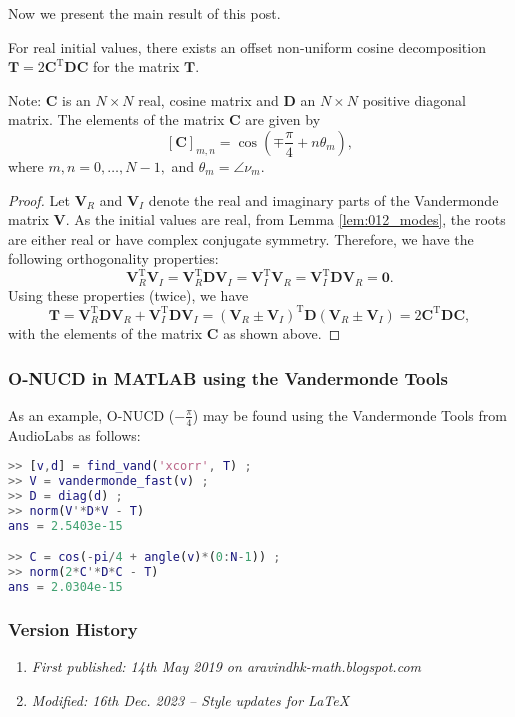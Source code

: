 Now we present the main result of this post.

\begin{theorem}[O-NUCD]
For real initial values, there exists an offset non-uniform cosine decomposition $\boldsymbol{T} = 2 \boldsymbol{C}^\text{T} \boldsymbol{D} \boldsymbol{C}$ for the matrix $\boldsymbol{T}.$
\end{theorem}

Note: $\boldsymbol{C}$ is an $N\times N$ real, cosine matrix and $\boldsymbol{D}$ an $N\times N$ positive diagonal matrix. The elements of the matrix $\boldsymbol{C}$ are given by \[
[\boldsymbol{C}]_{m,n} = \cos\left(\mp \frac{\pi}{4} + n \theta_m\right),\] where $m,n = 0,\dots,N-1,$  and $\theta_m = \angle \nu_m.$

\begin{proof}
Let $\boldsymbol{V}_R$ and $\boldsymbol{V}_I$ denote the real and imaginary parts of the Vandermonde matrix $\boldsymbol{V}.$ As the initial values are real, from Lemma \ref{lem:012_modes}, the roots are either real or have complex conjugate symmetry. Therefore, we have the following orthogonality properties: \[\boldsymbol{V}_R^\text{T} \boldsymbol{V}_I = \boldsymbol{V}_R^\text{T} \boldsymbol{D} \boldsymbol{V}_I = \boldsymbol{V}_I^\text{T} \boldsymbol{V}_R = \boldsymbol{V}_I^\text{T} \boldsymbol{D} \boldsymbol{V}_R =\boldsymbol{0}.\] Using these properties (twice), we have \[\boldsymbol{T} =  \boldsymbol{V}_R^\text{T} \boldsymbol{D} \boldsymbol{V}_R +  \boldsymbol{V}_I^\text{T} \boldsymbol{D} \boldsymbol{V}_I = (\boldsymbol{V}_R \pm \boldsymbol{V}_I)^\text{T} \boldsymbol{D} (\boldsymbol{V}_R \pm \boldsymbol{V}_I) = 2 \boldsymbol{C}^\text{T} \boldsymbol{D} \boldsymbol{C},\] with the elements of the matrix $\boldsymbol{C}$ as shown above.
\end{proof}

\subsubsection{O-NUCD in MATLAB using the Vandermonde Tools}
As an example, O-NUCD ($-\frac{\pi}{4}$) may be found using the Vandermonde Tools from AudioLabs \cite{Backstrom2015} as follows:

\begin{lstlisting}[language=MATLAB,numbers=none]
>> [v,d] = find_vand('xcorr', T) ;
>> V = vandermonde_fast(v) ;
>> D = diag(d) ;
>> norm(V'*D*V - T)
ans = 2.5403e-15

>> C = cos(-pi/4 + angle(v)*(0:N-1)) ;
>> norm(2*C'*D*C - T)
ans = 2.0304e-15
\end{lstlisting}

\subsubsection{Version History}
\begin{enumerate}
	\item \emph{First published: 14th May 2019 on aravindhk-math.blogspot.com}
	\item \emph{Modified: 16th Dec. 2023 -- Style updates for \LaTeX}
\end{enumerate}


